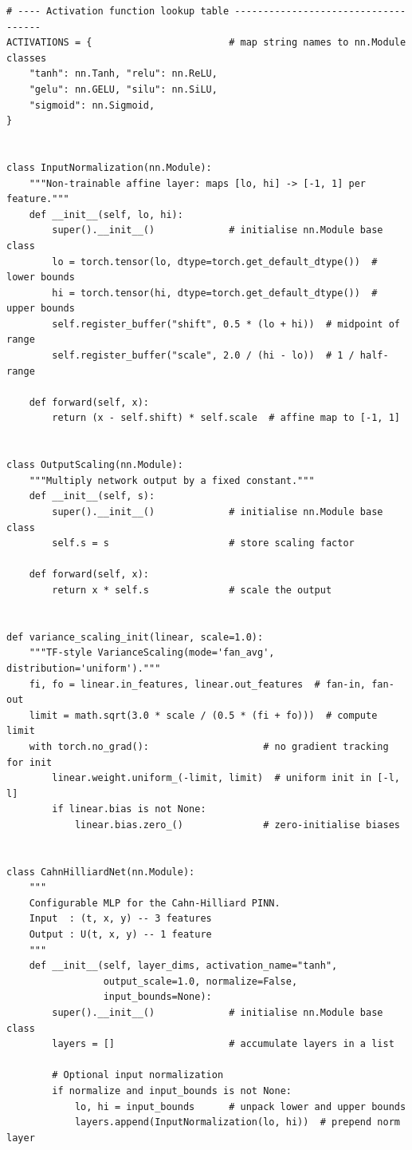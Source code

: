 \documentclass[11pt,a4paper]{article}
\begin{document}
\begin{lstlisting}
# ---- Activation function lookup table ------------------------------------
ACTIVATIONS = {                        # map string names to nn.Module classes
    "tanh": nn.Tanh, "relu": nn.ReLU,
    "gelu": nn.GELU, "silu": nn.SiLU,
    "sigmoid": nn.Sigmoid,
}


class InputNormalization(nn.Module):
    """Non-trainable affine layer: maps [lo, hi] -> [-1, 1] per feature."""
    def __init__(self, lo, hi):
        super().__init__()             # initialise nn.Module base class
        lo = torch.tensor(lo, dtype=torch.get_default_dtype())  # lower bounds
        hi = torch.tensor(hi, dtype=torch.get_default_dtype())  # upper bounds
        self.register_buffer("shift", 0.5 * (lo + hi))  # midpoint of range
        self.register_buffer("scale", 2.0 / (hi - lo))  # 1 / half-range

    def forward(self, x):
        return (x - self.shift) * self.scale  # affine map to [-1, 1]


class OutputScaling(nn.Module):
    """Multiply network output by a fixed constant."""
    def __init__(self, s):
        super().__init__()             # initialise nn.Module base class
        self.s = s                     # store scaling factor

    def forward(self, x):
        return x * self.s              # scale the output


def variance_scaling_init(linear, scale=1.0):
    """TF-style VarianceScaling(mode='fan_avg', distribution='uniform')."""
    fi, fo = linear.in_features, linear.out_features  # fan-in, fan-out
    limit = math.sqrt(3.0 * scale / (0.5 * (fi + fo)))  # compute limit
    with torch.no_grad():                    # no gradient tracking for init
        linear.weight.uniform_(-limit, limit)  # uniform init in [-l, l]
        if linear.bias is not None:
            linear.bias.zero_()              # zero-initialise biases


class CahnHilliardNet(nn.Module):
    """
    Configurable MLP for the Cahn-Hilliard PINN.
    Input  : (t, x, y) -- 3 features
    Output : U(t, x, y) -- 1 feature
    """
    def __init__(self, layer_dims, activation_name="tanh",
                 output_scale=1.0, normalize=False,
                 input_bounds=None):
        super().__init__()             # initialise nn.Module base class
        layers = []                    # accumulate layers in a list

        # Optional input normalization
        if normalize and input_bounds is not None:
            lo, hi = input_bounds      # unpack lower and upper bounds
            layers.append(InputNormalization(lo, hi))  # prepend norm layer


\end{lstlisting}
\end{document}

